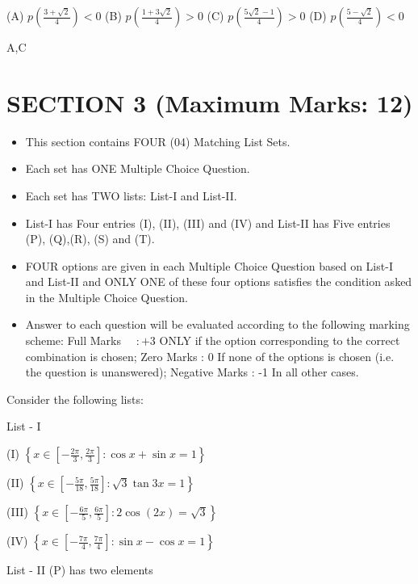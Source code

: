 (A) $p\left(\frac{3+\sqrt{2}}{4}\right)<0$
(B) $p\left(\frac{1+3 \sqrt{2}}{4}\right)>0$
(C) $p\left(\frac{5 \sqrt{2}-1}{4}\right)>0$
(D) $p\left(\frac{5-\sqrt{2}}{4}\right)<0$

A,C

\section{SECTION 3 (Maximum Marks: 12)}
\begin{itemize}
  \item This section contains FOUR (04) Matching List Sets.

  \item Each set has ONE Multiple Choice Question.

  \item Each set has TWO lists: List-I and List-II.

  \item List-I has Four entries (I), (II), (III) and (IV) and List-II has Five entries (P), (Q),(R), (S) and (T).

  \item FOUR options are given in each Multiple Choice Question based on List-I and List-II and ONLY ONE of these four options satisfies the condition asked in the Multiple Choice Question.

  \item Answer to each question will be evaluated according to the following marking scheme: Full Marks $\quad:+3$ ONLY if the option corresponding to the correct combination is chosen; Zero Marks : 0 If none of the options is chosen (i.e. the question is unanswered); Negative Marks : -1 In all other cases.

\end{itemize}

Consider the following lists:

List - I

(I) $\left\{x \in\left[-\frac{2 \pi}{3}, \frac{2 \pi}{3}\right]: \cos x+\sin x=1\right\}$

(II) $\left\{x \in\left[-\frac{5 \pi}{18}, \frac{5 \pi}{18}\right]: \sqrt{3} \tan 3 x=1\right\}$

(III) $\left\{x \in\left[-\frac{6 \pi}{5}, \frac{6 \pi}{5}\right]: 2 \cos (2 x)=\sqrt{3}\right\}$

(IV) $\left\{x \in\left[-\frac{7 \pi}{4}, \frac{7 \pi}{4}\right]: \sin x-\cos x=1\right\}$

List - II
(P) has two elements

